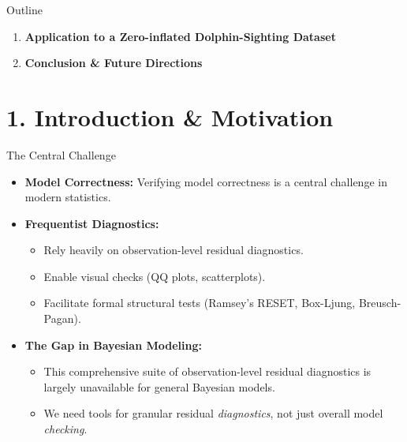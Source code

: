 \documentclass[
  ignorenonframetext,
]{beamer}
\providecommand{\tightlist}{%
  \setlength{\itemsep}{0pt}\setlength{\parskip}{0pt}}
\begin{document}
\begin{frame}{Outline}
\begin{enumerate}
  \begin{itemize}
  \tightlist
  \item
    Continuous Inverse Gaussian Regression
  \item
    Discrete Hurdle Negative Binomial Regression
  \end{itemize}
\item
  \textbf{Application to a Zero-inflated Dolphin-Sighting Dataset}
\item
  \textbf{Conclusion \& Future Directions}
\end{enumerate}
\end{frame}

\section{1. Introduction \& Motivation}\label{introduction-motivation}

\begin{frame}{The Central Challenge}
\protect{}\label{the-central-challenge}
\begin{itemize}
\tightlist
\item
  \textbf{Model Correctness:} Verifying model correctness is a central
  challenge in modern statistics.
\item
  \textbf{Frequentist Diagnostics:}

  \begin{itemize}
  \tightlist
  \item
    Rely heavily on observation-level residual diagnostics.
  \item
    Enable visual checks (QQ plots, scatterplots).
  \item
    Facilitate formal structural tests (Ramsey's RESET, Box-Ljung,
    Breusch-Pagan).
  \end{itemize}
\item
  \textbf{The Gap in Bayesian Modeling:}

  \begin{itemize}
  \tightlist
  \item
    This comprehensive suite of observation-level residual diagnostics
    is largely unavailable for general Bayesian models.
  \item
    We need tools for granular residual \emph{diagnostics}, not just
    overall model \emph{checking}.
  \end{itemize}
\end{itemize}
\end{frame}
\end{document}
